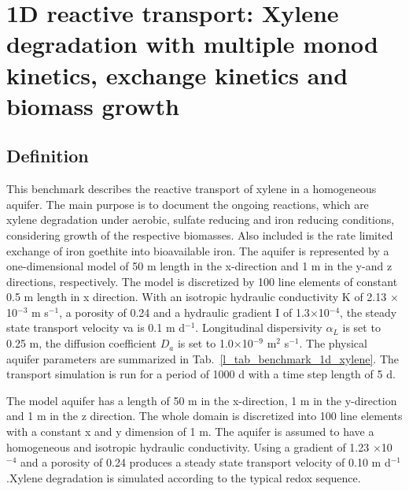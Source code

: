 \section [Xylene degradation (1D)]{1D reactive transport: Xylene degradation with multiple monod kinetics, exchange kinetics and biomass growth}
\label{l_s_benchmark_1d_xylene_deg}

\subsection{Definition}
This benchmark describes the reactive transport of xylene in a homogeneous aquifer. The main purpose is to document the ongoing reactions, which are xylene degradation under aerobic, sulfate reducing and iron reducing conditions, considering growth of the respective biomasses. Also included is the rate limited exchange of iron goethite into bioavailable iron. The aquifer is represented by a one-dimensional model of 50 m length in the x-direction and 1 m in the y-and z directions, respectively. The model is discretized by 100 line elements of constant 0.5 m length in x direction. With an isotropic hydraulic conductivity K of 2.13 $\times$10$^{-3}$ m s$^{-1}$, a porosity of 0.24 and a hydraulic gradient I of 1.3$\times$10$^{-4}$, the steady state transport velocity va is 0.1 m d$^{-1}$. Longitudinal dispersivity  $\alpha_L$ is set to 0.25 m, the diffusion coefficient $D_a$ is set to 1.0$\times$10$^{-9}$ m$^2$ s$^{-1}$. The physical aquifer parameters are summarized in Tab.~\ref{l_tab_benchmark_1d_xylene}. The transport simulation is run for a period of 1000 d with a time step length of 5 d.

The model aquifer has a length of 50 m in the x-direction, 1 m in the y-direction and 1 m in the z direction. The whole domain is discretized into 100 line elements with a constant x and y dimension of 1 m.
The aquifer is assumed to have a homogeneous and isotropic hydraulic conductivity. Using a gradient of 1.23 $\times$10$^{-4}$ and a porosity of 0.24 produces a steady state transport velocity of 0.10 m d$^{-1}$.Xylene degradation is simulated according to the typical redox sequence.



